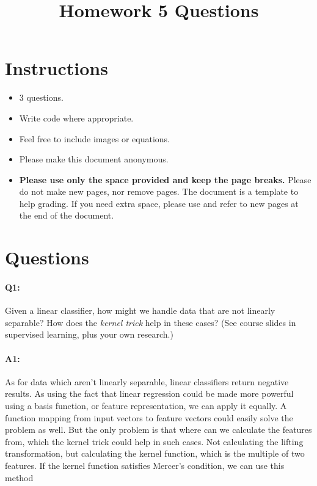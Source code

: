 \date{}

\title{\vspace{-1.5cm}Homework 5 Questions}



\maketitle
\vspace{-3cm}
\thispagestyle{fancy}

\section*{Instructions}
\begin{itemize}
  \item 3 questions.
  \item Write code where appropriate.
  \item Feel free to include images or equations.
  \item Please make this document anonymous.
  \item \textbf{Please use only the space provided and keep the page breaks.} Please do not make new pages, nor remove pages. The document is a template to help grading. If you need extra space, please use and refer to new pages at the end of the document.
\end{itemize}

\section*{Questions}

\paragraph{Q1:} Given a linear classifier, how might we handle data that are not linearly separable? How does the \emph{kernel trick} help in these cases? (See course slides in supervised learning, plus your own research.)

\paragraph{A1:} As for data which aren't linearly separable, linear classifiers return negative results. As using the fact that linear regression could be made more powerful using a basis function, or feature representation, we can apply it equally. A function mapping from input vectors to feature vectors could easily solve the problem as well. But the only problem is that where can we calculate the features from, which the kernel trick could help in such cases. Not calculating the lifting transformation, but calculating the kernel function, which is the multiple of two features. If the kernel function satisfies Mercer's condition, we can use this method



